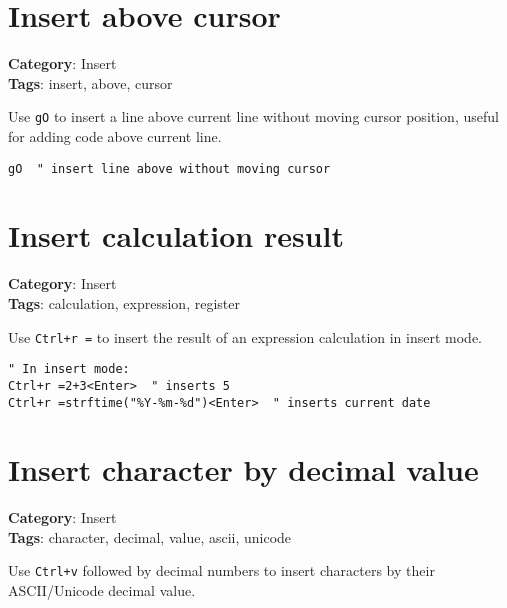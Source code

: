 {{{{{\section{Insert above cursor}

\textbf{Category}: Insert\\ \textbf{Tags}: insert, above, cursor
\vspace{0.5cm}

Use {\footnotesize \Verb§gO§} to insert a line above current line without moving cursor position, useful for adding code above current line.

\begin{Exa*}{}
\begin{Verbatim}[fontsize=\footnotesize, breaklines, breakanywhere]
gO  " insert line above without moving cursor
\end{Verbatim}
\end{Exa*}

\section{Insert calculation result}

\textbf{Category}: Insert\\ \textbf{Tags}: calculation, expression, register
\vspace{0.5cm}

Use {\footnotesize \Verb§Ctrl+r =§} to insert the result of an expression calculation in insert mode.

\begin{Exa*}{}
\begin{Verbatim}[fontsize=\footnotesize, breaklines, breakanywhere]
" In insert mode:
Ctrl+r =2+3<Enter>  " inserts 5
Ctrl+r =strftime("%Y-%m-%d")<Enter>  " inserts current date
\end{Verbatim}
\end{Exa*}

\section{Insert character by decimal value}

\textbf{Category}: Insert\\ \textbf{Tags}: character, decimal, value, ascii, unicode
\vspace{0.5cm}

Use {\footnotesize \Verb§Ctrl+v§} followed by decimal numbers to insert characters by their ASCII/Unicode decimal value.

}}}}}
